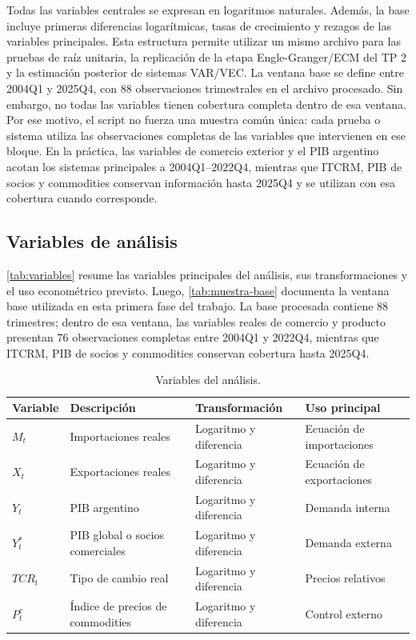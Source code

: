 \documentclass[11pt,a4paper]{article}
\begin{document}
	Todas las variables centrales se expresan en logaritmos naturales. Además, la
	base incluye primeras diferencias logarítmicas, tasas de crecimiento y rezagos
	de las variables principales. Esta estructura permite utilizar un mismo archivo
	para las pruebas de raíz unitaria, la replicación de la etapa Engle-Granger/ECM
	del TP 2 y la estimación posterior de sistemas VAR/VEC. La ventana base se
	define entre 2004Q1 y 2025Q4, con 88 observaciones trimestrales en el archivo
	procesado. Sin embargo, no todas las variables tienen cobertura completa dentro
	de esa ventana. Por ese motivo, el script no fuerza una muestra común única:
	cada prueba o sistema utiliza las observaciones completas de las variables que
	intervienen en ese bloque. En la práctica, las variables de comercio exterior y
	el PIB argentino acotan los sistemas principales a 2004Q1--2022Q4, mientras que
	ITCRM, PIB de socios y commodities conservan información hasta 2025Q4 y se
	utilizan con esa cobertura cuando corresponde.
	
	\subsection{Variables de análisis}
	\label{subsec:datos-variables}
	
	\autoref{tab:variables} resume las variables principales del análisis, sus
	transformaciones y el uso econométrico previsto. Luego,
	\autoref{tab:muestra-base} documenta la ventana base utilizada en esta primera
	fase del trabajo. La base procesada contiene 88 trimestres; dentro de esa
	ventana, las variables reales de comercio y producto presentan 76 observaciones
	completas entre 2004Q1 y 2022Q4, mientras que ITCRM, PIB de socios y commodities
	conservan cobertura hasta 2025Q4.
	
	\begin{table}[H]
		\centering
		\caption{Variables del análisis.}
		\label{tab:variables}
		\small
		\begin{tabular}{p{3.2cm}p{4.5cm}p{3.2cm}p{3.2cm}}
			\toprule
			Variable & Descripción & Transformación & Uso principal \\
			\midrule
			$M_t$ & Importaciones reales & Logaritmo y diferencia & Ecuación de importaciones \\
			$X_t$ & Exportaciones reales & Logaritmo y diferencia & Ecuación de exportaciones \\
			$Y_t$ & PIB argentino & Logaritmo y diferencia & Demanda interna \\
			$Y_t^*$ & PIB global o socios comerciales & Logaritmo y diferencia & Demanda externa \\
			$TCR_t$ & Tipo de cambio real & Logaritmo y diferencia & Precios relativos \\
			$P_t^c$ & Índice de precios de commodities & Logaritmo y diferencia & Control externo \\
			\bottomrule
		\end{tabular}
	\end{table}
	
\end{document}
